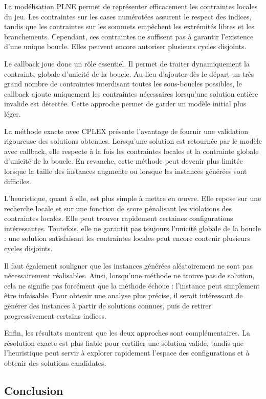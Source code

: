 La modélisation PLNE permet de représenter efficacement les contraintes locales du jeu. Les contraintes sur les cases numérotées assurent le respect des indices, tandis que les contraintes sur les sommets empêchent les extrémités libres et les branchements. Cependant, ces contraintes ne suffisent pas à garantir l'existence d'une unique boucle. Elles peuvent encore autoriser plusieurs cycles disjoints.

Le callback joue donc un rôle essentiel. Il permet de traiter dynamiquement la contrainte globale d'unicité de la boucle. Au lieu d'ajouter dès le départ un très grand nombre de contraintes interdisant toutes les sous-boucles possibles, le callback ajoute uniquement les contraintes nécessaires lorsqu'une solution entière invalide est détectée. Cette approche permet de garder un modèle initial plus léger.

La méthode exacte avec CPLEX présente l'avantage de fournir une validation rigoureuse des solutions obtenues. Lorsqu'une solution est retournée par le modèle avec callback, elle respecte à la fois les contraintes locales et la contrainte globale d'unicité de la boucle. En revanche, cette méthode peut devenir plus limitée lorsque la taille des instances augmente ou lorsque les instances générées sont difficiles.

L'heuristique, quant à elle, est plus simple à mettre en œuvre. Elle repose sur une recherche locale et sur une fonction de score pénalisant les violations des contraintes locales. Elle peut trouver rapidement certaines configurations intéressantes. Toutefois, elle ne garantit pas toujours l'unicité globale de la boucle : une solution satisfaisant les contraintes locales peut encore contenir plusieurs cycles disjoints.

Il faut également souligner que les instances générées aléatoirement ne sont pas nécessairement réalisables. Ainsi, lorsqu'une méthode ne trouve pas de solution, cela ne signifie pas forcément que la méthode échoue : l'instance peut simplement être infaisable. Pour obtenir une analyse plus précise, il serait intéressant de générer des instances à partir de solutions connues, puis de retirer progressivement certains indices.

Enfin, les résultats montrent que les deux approches sont complémentaires. La résolution exacte est plus fiable pour certifier une solution valide, tandis que l'heuristique peut servir à explorer rapidement l'espace des configurations et à obtenir des solutions candidates.

\subsection{Conclusion}

